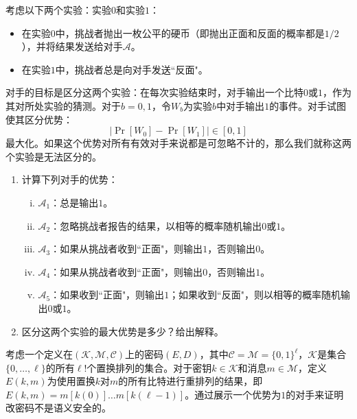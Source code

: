 \begin{exercise}[在简单环境下计算优势]\label{exer:2-13}
考虑以下两个实验：实验$0$和实验$1$：
\begin{itemize}
	\item 在实验$0$中，挑战者抛出一枚公平的硬币（即抛出正面和反面的概率都是$1/2$），并将结果发送给对手$\mathcal{A}$。
	\item 在实验$1$中，挑战者总是向对手发送``反面"。
\end{itemize}
对手的目标是区分这两个实验：在每次实验结束时，对手输出一个比特$0$或$1$，作为其对所处实验的猜测。对于$b=0,1$，令$W_b$为实验$b$中对手输出$1$的事件。对手试图使其区分优势：
\[
\big\vert\Pr[W_0]-\Pr[W_1]\big\vert\in[0,1]
\]
最大化。如果这个优势对所有有效对手来说都是可忽略不计的，那么我们就称这两个实验是无法区分的。
\begin{enumerate}[\indent(a)]
	\item 计算下列对手的优势：
	\begin{enumerate}[(i)]
		\item $\mathcal{A}_1$：总是输出$1$。
		\item $\mathcal{A}_2$：忽略挑战者报告的结果，以相等的概率随机输出$0$或$1$。
		\item $\mathcal{A}_3$：如果从挑战者收到``正面"，则输出$1$，否则输出$0$。
		\item $\mathcal{A}_4$：如果从挑战者收到``正面"，则输出$0$，否则输出$1$。
		\item $\mathcal{A}_5$：如果收到``正面"，则输出$1$；如果收到``反面"，则以相等的概率随机输出$0$或$1$。
	\end{enumerate}
	\item 区分这两个实验的最大优势是多少？给出解释。
\end{enumerate}
\end{exercise}

\begin{exercise}[置换密码]\label{exer:2-14}
考虑一个定义在$(\mathcal{K},\mathcal{M},\mathcal{C})$上的密码$(E,D)$，其中$\mathcal{C}=\mathcal{M}=\{0,1\}^\ell$，$\mathcal{K}$是集合$\{0,\dots,\ell\}$的所有$\ell!$个置换排列的集合。对于密钥$k\in\mathcal{K}$和消息$m\in\mathcal{M}$，定义$E(k,m)$为使用置换$k$对$m$的所有比特进行重排列的结果，即$E(k,m)=m[k(0)]\dots m[k(\ell-1)]$。通过展示一个优势为$1$的对手来证明改密码不是语义安全的。
\end{exercise}

